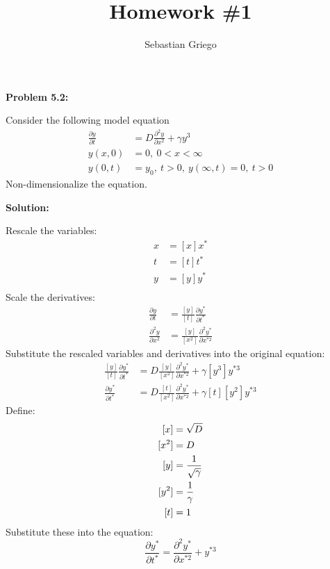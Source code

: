 \documentclass[12pt]{article}
\newenvironment{problem}[1]{
\textbf{Problem #1:}
}{
\rmfamily \vspace{1em}
}
\newenvironment{solution}{
\textbf{Solution:}

}{

\vspace{2em}
}
\begin{document}
\title{Homework \#1}  %
\author{Sebastian Griego}  %

\begin{problem}{5.2}
    Consider the following model equation
    \[
        \begin{aligned}
            \frac{\partial y}{\partial t} &= D\frac{\partial^2 y}{\partial x^2} + \gamma y^3 \\
            y(x,0) &= 0, \: 0 < x < \infty \\
            y(0,t) &= y_0, \: t > 0, \: y(\infty, t) = 0, \: t > 0
        \end{aligned}
    \]
    Non-dimensionalize the equation.
\end{problem}

\begin{solution}
    Rescale the variables:
    \[
        \begin{aligned}
            x &= [x]x^* \\
            t &= [t]t^* \\
            y &= [y]y^* \\
        \end{aligned}
    \]
    Scale the derivatives:
    \[
        \begin{aligned}
            \frac{\partial y}{\partial t} &= \frac{[y]}{[t]} \frac{\partial y^*}{\partial t^*}\\
            \frac{\partial^2 y}{\partial x^2} &= \frac{[y]}{[x^2]} \frac{\partial^2 y^*}{\partial x^{*2}}
        \end{aligned}
    \]
    Substitute the rescaled variables and derivatives into the original equation:
    \[
        \begin{aligned}
            \frac{[y]}{[t]} \frac{\partial y^*}{\partial t^*} &= D \frac{[y]}{[x^2]} \frac{\partial^2 y^*}{\partial x^{*2}} + \gamma [y^3] y^{*3} \\
            \frac{\partial y^*}{\partial t^*} &= D\frac{[t]}{[x^2]} \frac{\partial^2 y^*}{\partial x^{*2}} + \gamma [t][y^2] y^{*3}
        \end{aligned}
    \]
    Define:
    \[
        \begin{aligned}\relax
            [x] &= \sqrt{D} \\
            [x^2] &= D \\
            [y] &= \frac{1}{\sqrt{\gamma}}\\
            [y^2] &= \frac{1}{\gamma}\\
            [t] &= 1
        \end{aligned}
    \]
    Substitute these into the equation:
    \[
        \frac{\partial y^*}{\partial t^*} = \frac{\partial^2 y^*}{\partial x^{*2}} + y^{*3}
    \]
    
    
\end{solution}
\end{document}
